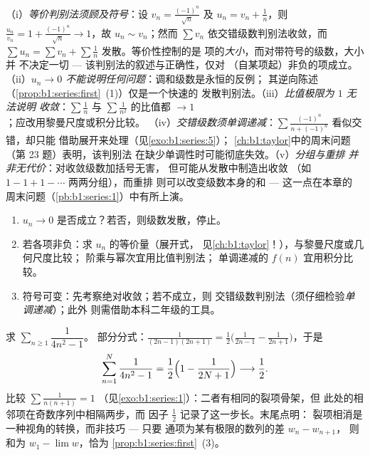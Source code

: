 \begin{remark}[级数的常见误区]
（i）\emph{等价判别法须顾及符号}：设 $v_n =
\frac{(-1)^n}{\sqrt n}$ 及 $u_n = v_n + \frac1n$，则
$\frac{u_n}{v_n} = 1 + \frac{(-1)^n}{\sqrt n} \to 1$，故 $u_n
\sim v_n$；然而 $\sum v_n$ 依交错级数判别法收敛，而
$\sum u_n = \sum v_n + \sum \frac1n$ 发散。等价性控制的是
项的\emph{大小}，而对带符号的级数，大小并
不决定一切 --- 该判别法的叙述与正确性，仅对
（自某项起）非负的项成立。（ii）\emph{$u_n \to 0$
不能说明任何问题}：调和级数是永恒的反例；
其逆向陈述
（\cref{prop:b1:series:first}~(1)）仅是一个快速的
发散判别法。（iii）\emph{比值极限为 $1$ 无法说明
收敛}：$\sum\frac1n$ 与 $\sum\frac{1}{n^2}$ 的比值都
$\to 1$；应改用黎曼尺度或积分比较。
（iv）\emph{交错级数须单调递减}：$\sum
\frac{(-1)^n}{n + (-1)^n}$ 看似交错，却只能
借助展开来处理（见\cref{exo:b1:series:5}）；
\cref{ch:b1:taylor}中的周末问题（第 23 题）表明，该判别法
在缺少单调性时可能彻底失效。（v）\emph{分组与重排
并非无代价}：对收敛级数加括号无害，
但可能从发散中制造出收敛
（如 $1 - 1 + 1 - \cdots$ 两两分组），而重排
则可以改变级数本身的和 --- 这一点在本章的
周末问题（\cref{pb:b1:series:1}）中有所上演。
\end{remark}

\begin{method}[判定级数的敛散性]\label{met:b1:series:decide}
\begin{enumerate}
  \item $u_n \to 0$ 是否成立？若否，则级数发散，停止。
  \item 若各项非负：求 $u_n$ 的等价量（展开式，
        见\cref{ch:b1:taylor}！），与黎曼尺度或几何尺度比较；
        阶乘与幂次宜用比值判别法；
        单调递减的 $f(n)$ 宜用积分比较。
  \item 符号可变：先考察绝对收敛；若不成立，则
        交错级数判别法（须仔细检验\emph{单调递减}）；此外
        则需借助本科二年级的工具。
\end{enumerate}
\end{method}

\begin{example}\label{ex:b1:series:oddtelescope}
求 $\sum_{n \geq 1} \dfrac{1}{4n^2 - 1}$。
部分分式：$\frac{1}{(2n-1)(2n+1)} =
\frac12\bigl(\frac{1}{2n-1} - \frac{1}{2n+1}\bigr)$，于是
\[
\sum_{n=1}^{N} \frac{1}{4n^2 - 1}
= \frac12\Bigl(1 - \frac{1}{2N+1}\Bigr)
\longrightarrow \frac12 .
\]
比较 $\sum \frac{1}{n(n+1)} = 1$
（见\cref{exo:b1:series:1}）：二者有相同的裂项骨架，但
此处的相邻项在奇数序列中相隔两步，而
因子 $\frac12$ 记录了这一步长。末尾点明：
裂项相消是一种视角的转换，而非技巧 --- 只要
通项为某有极限的数列的差 $w_n - w_{n+1}$，
则和为 $w_1 - \lim w$，恰为
\cref{prop:b1:series:first}~(3)。
\end{example}

